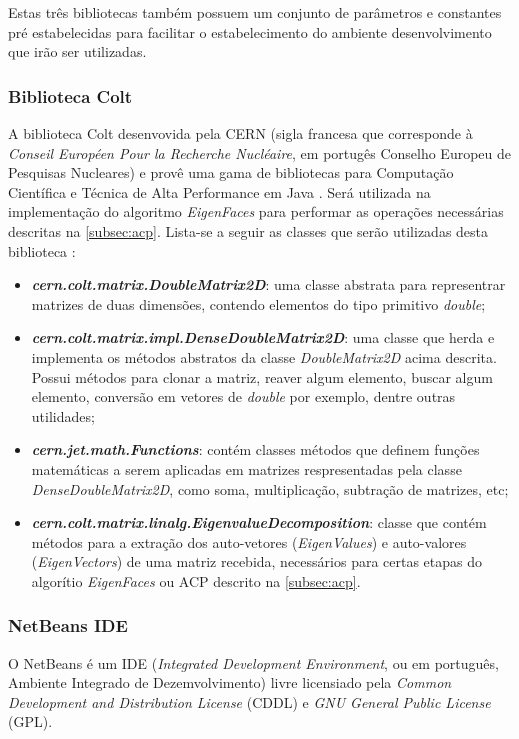 Estas três bibliotecas também possuem um conjunto de parâmetros e constantes pré estabelecidas para facilitar o estabelecimento do ambiente desenvolvimento que irão ser utilizadas.

\subsubsection{Biblioteca Colt}\label{subsec:bib_colt}
A biblioteca Colt desenvovida pela CERN (sigla francesa que corresponde à \textit{Conseil Européen Pour la Recherche Nucléaire}, em portugês Conselho Europeu de Pesquisas Nucleares) e provê uma gama de bibliotecas para Computação Científica e Técnica de Alta Performance em Java \cite{colt}. Será utilizada na implementação do algoritmo \textit{EigenFaces} para performar as operações necessárias descritas na \autoref{subsec:acp}. Lista-se a seguir as classes que serão utilizadas desta biblioteca \cite{colt}:


\begin{itemize}
	\item \textbf{\textit{cern.colt.matrix.DoubleMatrix2D}}: uma classe abstrata para representrar matrizes de duas dimensões, contendo elementos do tipo primitivo \textit{double};
	
	\item \textbf{\textit{cern.colt.matrix.impl.DenseDoubleMatrix2D}}: uma classe que herda e implementa os métodos abstratos da classe \textit{DoubleMatrix2D} acima descrita. Possui métodos para clonar a matriz, reaver algum elemento, buscar algum elemento, conversão em vetores de \textit{double} por exemplo, dentre outras utilidades;
			
	\item \textbf{\textit{cern.jet.math.Functions}}:  contém classes métodos que definem funções matemáticas a serem aplicadas em matrizes respresentadas pela classe \textit{DenseDoubleMatrix2D}, como soma, multiplicação, subtração de matrizes, etc;
	
	\item \textbf{\textit{cern.colt.matrix.linalg.EigenvalueDecomposition}}: classe que contém métodos para a extração dos auto-vetores (\textit{EigenValues}) e auto-valores (\textit{EigenVectors}) de uma matriz recebida, necessários para certas etapas do algorítio \textit{EigenFaces} ou ACP descrito na \autoref{subsec:acp}.
\end{itemize}		

\subsubsection{NetBeans IDE}\label{subsec:netbeans}
O NetBeans é um IDE (\textit{Integrated Development Environment}, ou em português, Ambiente Integrado de Dezemvolvimento) livre licensiado pela \textit{Common Development and Distribution License} (CDDL) e \textit{GNU General Public License} (GPL).

